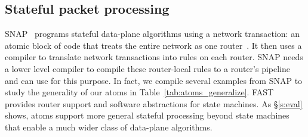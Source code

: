 \subsection{Stateful packet processing}
SNAP~\cite{snap} programs stateful data-plane algorithms using a network
transaction: an atomic block of code that treats the entire network as one
router~\cite{onebigswitch}. It then uses a compiler to translate network
transactions into rules on each router. SNAP needs a lower level compiler to
compile these router-local rules to a router's pipeline and can use
\pktlanguage for this purpose. In fact, we compile several examples from SNAP
to study the generality of our atoms in Table~\ref{tab:atoms_generalize}.
FAST~\cite{fast} provides router support and software abstractions for state
machines. As \S\ref{s:eval} shows, atoms support more general stateful
processing beyond state machines that enable a much wider class of data-plane
algorithms.

